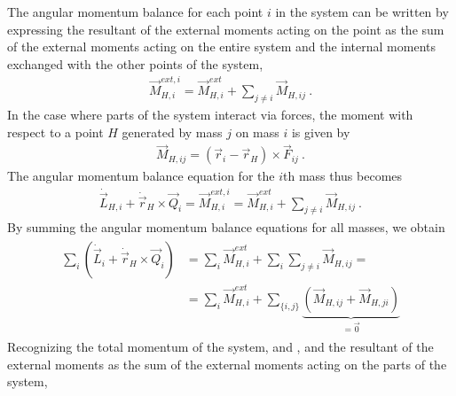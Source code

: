 \documentclass[letterpaper,10pt,english]{jupyterBook}
\begin{document}
\sphinxAtStartPar
{}
The angular momentum balance for each point \(i\) in the system can be written by expressing the resultant of the external moments acting on the point as the sum of the external moments acting on the entire system and the internal moments exchanged with the other points of the system,
\begin{equation*}
\begin{split}\vec{M}_{H,i}^{ext,i} = \vec{M}_{H,i}^{ext} + \sum_{j \ne i} \vec{M}_{H,ij} \ .\end{split}
\end{equation*}
\sphinxAtStartPar
In the case where parts of the system interact via forces, the moment with respect to a point \(H\) generated by mass \(j\) on mass \(i\) is given by
\begin{equation*}
\begin{split}\vec{M}_{H,ij} = (\vec{r}_i - \vec{r}_H) \times \vec{F}_{ij} \ .\end{split}
\end{equation*}
\sphinxAtStartPar
The angular momentum balance equation for the \(i\)\sphinxhyphen{}th mass thus becomes
\begin{equation*}
\begin{split}\dot{\vec{L}}_{H,i} + \dot{\vec{r}}_H \times \vec{Q}_i = \vec{M}_{H,i}^{ext,i} = \vec{M}_{H,i}^{ext} + \sum_{j \ne i} \vec{M}_{H,ij} \ .\end{split}
\end{equation*}
\sphinxAtStartPar
By summing the angular momentum balance equations for all masses, we obtain
\begin{equation*}
\begin{split}\begin{aligned}
\sum_{i} \left( \dot{\vec{L}}_i + \dot{\vec{r}}_H \times \vec{Q}_i \right) & = \sum_i \vec{M}_{H,i}^{ext} + \sum_i \sum_{j \ne i} \vec{M}_{H,ij} = \\
                            & = \sum_i \vec{M}_{H,i}^{ext} + \sum_{\{i,j\}} \underbrace{\left( \vec{M}_{H,ij} + \vec{M}_{H,ji} \right)}_{=\vec{0}} 
\end{aligned}\end{split}
\end{equation*}
\sphinxAtStartPar
Recognizing the total momentum of the system, and , and the resultant of the external moments as the sum of the external moments acting on the parts of the system,
\end{document}
